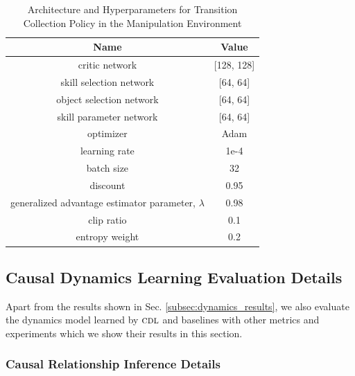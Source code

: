 \begin{table}
\centering
\caption{Architecture and Hyperparameters for Transition Collection Policy in the Manipulation Environment}
\vspace{-0pt}
\begin{small}
\begin{tabular}{cc}
\toprule
\textbf{Name}   & \textbf{Value} \\
\midrule
critic network              & [128, 128] \\
skill selection network     & [64, 64] \\
object selection network    & [64, 64] \\
skill parameter network     & [64, 64] \\
\midrule
optimizer                   & Adam \\
learning rate               & 1e-4 \\
batch size                  & 32 \\
discount                    & 0.95 \\
generalized advantage estimator parameter, $\lambda$    & 0.98 \\
clip ratio                  & 0.1 \\
entropy weight              & 0.2 \\
\bottomrule
\end{tabular}
\end{small}
\vspace{-0pt}
\label{tab:hippo_hyperprarams}
\end{table}

\subsection{Causal Dynamics Learning Evaluation Details}
\label{app:dynamics_results}

Apart from the results shown in Sec. \ref{subsec:dynamics_results}, we also evaluate the dynamics model learned by $\textsc{cdl}$ and baselines with other metrics and experiments which we show their results in this section.

\subsubsection{Causal Relationship Inference Details}
\label{app:causal_graph_results}

